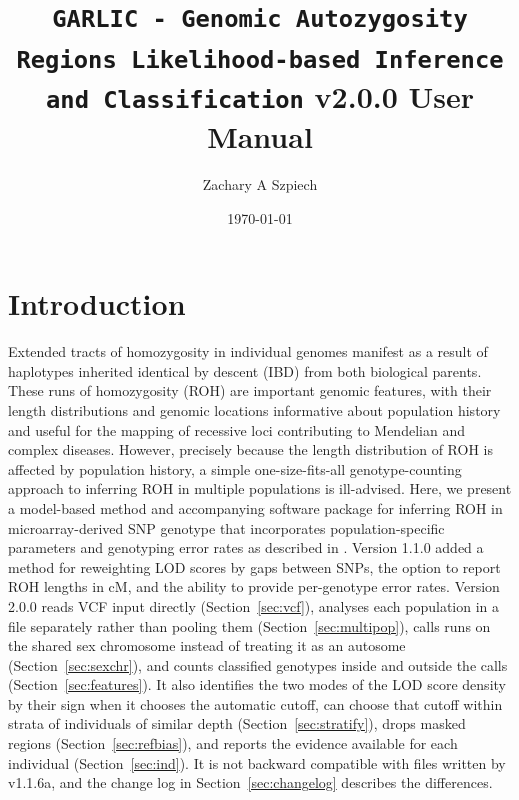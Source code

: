 \documentclass[12pt]{article}%
\title{{\tt GARLIC - Genomic Autozygosity Regions Likelihood-based Inference and Classification} v2.0.0 User Manual}
\date{\today}
\author{Zachary A Szpiech}
\begin{document}
\lstset{breaklines=true,basicstyle=\ttfamily}

\null  %
\nointerlineskip  %
\vfill
\let\snewpage \newpage
\let\newpage \relax
\maketitle
\thispagestyle{empty}
\let \newpage \snewpage
\vfill 
\break %

\tableofcontents 

\newpage

\section{Introduction}

Extended tracts of homozygosity in individual genomes manifest as a result of haplotypes inherited identical by descent (IBD) from both biological parents. These runs of homozygosity (ROH) are important genomic features, with their length distributions and genomic locations informative about population history and useful for the mapping of recessive loci contributing to Mendelian and complex diseases. However, precisely because the length distribution of ROH is affected by population history, a simple one-size-fits-all genotype-counting approach to inferring ROH in multiple populations is ill-advised. Here, we present a model-based method and accompanying software package for inferring ROH in microarray-derived SNP genotype that incorporates population-specific parameters and genotyping error rates as described in \cite{PembertonEtAl12:AJHG}. Version 1.1.0 added a method for reweighting LOD scores by gaps between SNPs, the option to report ROH lengths in cM, and the ability to provide per-genotype error rates.  Version 2.0.0 reads VCF input directly (Section~\ref{sec:vcf}), analyses each population in a file separately rather than pooling them (Section~\ref{sec:multipop}), calls runs on the shared sex chromosome instead of treating it as an autosome (Section~\ref{sec:sexchr}), and counts classified genotypes inside and outside the calls (Section~\ref{sec:features}).  It also identifies the two modes of the LOD score density by their sign when it chooses the automatic cutoff, can choose that cutoff within strata of individuals of similar depth (Section~\ref{sec:stratify}), drops masked regions (Section~\ref{sec:refbias}), and reports the evidence available for each individual (Section~\ref{sec:ind}).  It is not backward compatible with files written by v1.1.6a, and the change log in Section~\ref{sec:changelog} describes the differences.
\end{document}

